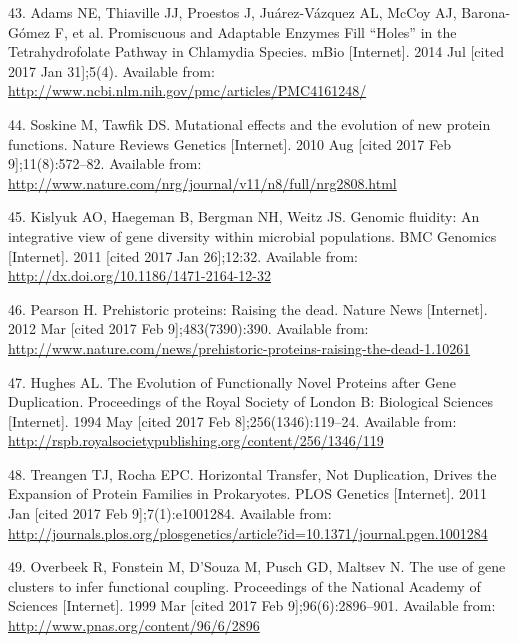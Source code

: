 \documentclass[12pt,twoside]{reedthesis}
\begin{document}
  \hypertarget{ref-adams_promiscuous_2014}{}
  43. Adams NE, Thiaville JJ, Proestos J, Juárez-Vázquez AL, McCoy AJ,
  Barona-Gómez F, et al. Promiscuous and Adaptable Enzymes Fill ``Holes''
  in the Tetrahydrofolate Pathway in Chlamydia Species. mBio
  {[}Internet{]}. 2014 Jul {[}cited 2017 Jan 31{]};5(4). Available from:
  \url{http://www.ncbi.nlm.nih.gov/pmc/articles/PMC4161248/}
  
  \hypertarget{ref-soskine_mutational_2010}{}
  44. Soskine M, Tawfik DS. Mutational effects and the evolution of new
  protein functions. Nature Reviews Genetics {[}Internet{]}. 2010 Aug
  {[}cited 2017 Feb 9{]};11(8):572--82. Available from:
  \url{http://www.nature.com/nrg/journal/v11/n8/full/nrg2808.html}
  
  \hypertarget{ref-kislyuk_genomic_2011}{}
  45. Kislyuk AO, Haegeman B, Bergman NH, Weitz JS. Genomic fluidity: An
  integrative view of gene diversity within microbial populations. BMC
  Genomics {[}Internet{]}. 2011 {[}cited 2017 Jan 26{]};12:32. Available
  from: \url{http://dx.doi.org/10.1186/1471-2164-12-32}
  
  \hypertarget{ref-pearson_prehistoric_2012}{}
  46. Pearson H. Prehistoric proteins: Raising the dead. Nature News
  {[}Internet{]}. 2012 Mar {[}cited 2017 Feb 9{]};483(7390):390. Available
  from:
  \url{http://www.nature.com/news/prehistoric-proteins-raising-the-dead-1.10261}
  
  \hypertarget{ref-hughes_evolution_1994}{}
  47. Hughes AL. The Evolution of Functionally Novel Proteins after Gene
  Duplication. Proceedings of the Royal Society of London B: Biological
  Sciences {[}Internet{]}. 1994 May {[}cited 2017 Feb
  8{]};256(1346):119--24. Available from:
  \url{http://rspb.royalsocietypublishing.org/content/256/1346/119}
  
  \hypertarget{ref-treangen_horizontal_2011}{}
  48. Treangen TJ, Rocha EPC. Horizontal Transfer, Not Duplication, Drives
  the Expansion of Protein Families in Prokaryotes. PLOS Genetics
  {[}Internet{]}. 2011 Jan {[}cited 2017 Feb 9{]};7(1):e1001284. Available
  from:
  \url{http://journals.plos.org/plosgenetics/article?id=10.1371/journal.pgen.1001284}
  
  \hypertarget{ref-overbeek_use_1999}{}
  49. Overbeek R, Fonstein M, D'Souza M, Pusch GD, Maltsev N. The use of
  gene clusters to infer functional coupling. Proceedings of the National
  Academy of Sciences {[}Internet{]}. 1999 Mar {[}cited 2017 Feb
  9{]};96(6):2896--901. Available from:
  \url{http://www.pnas.org/content/96/6/2896}
  
\end{document}
